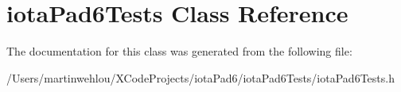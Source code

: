 \hypertarget{interfaceiota_pad6_tests}{
\section{iotaPad6Tests Class Reference}
\label{interfaceiota_pad6_tests}
}


The documentation for this class was generated from the following file:\begin{DoxyCompactItemize}
\item 
/Users/martinwehlou/XCodeProjects/iotaPad6/iotaPad6Tests/iotaPad6Tests.h\end{DoxyCompactItemize}
